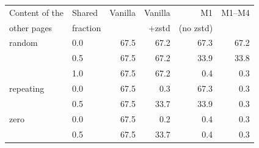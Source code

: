 \begin{tabular}{llrrrr}
\toprule
Content of the & Shared & Vanilla & Vanilla & M1 & M1--M4 \\
other pages & fraction & & +zstd & (no zstd) & \\
\midrule
random & 0.0 & 67.5 & 67.2 & 67.3 & 67.2 \\
 & 0.5 & 67.5 & 67.2 & 33.9 & 33.8 \\
 & 1.0 & 67.5 & 67.2 & 0.4 & 0.3 \\
repeating & 0.0 & 67.5 & 0.3 & 67.3 & 0.3 \\
 & 0.5 & 67.5 & 33.7 & 33.9 & 0.3 \\
zero & 0.0 & 67.5 & 0.2 & 0.4 & 0.3 \\
 & 0.5 & 67.5 & 33.7 & 0.4 & 0.3 \\
\bottomrule
\end{tabular}
